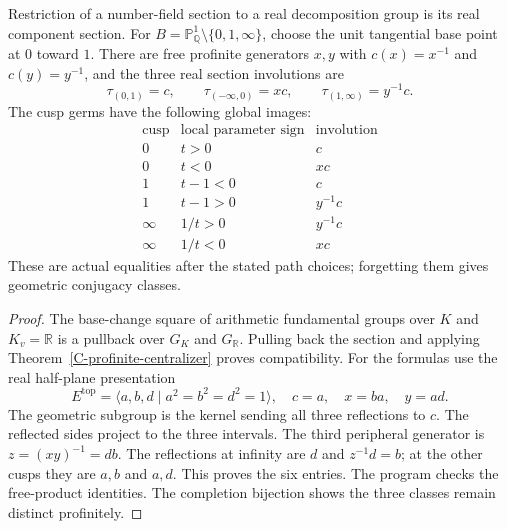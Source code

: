 \begin{proposition}
\label{C-tripod}
Restriction of a number-field section to a real
decomposition group is its real component section.
For $B=\mathbb P^1_{\mathbb Q}\setminus\{0,1,\infty\}$,
choose the unit tangential base point at $0$ toward $1$.
There are free profinite generators $x,y$ with
$c(x)=x^{-1}$ and $c(y)=y^{-1}$, and the three
real section involutions are
\[
 \tau_{(0,1)}=c,\qquad
 \tau_{(-\infty,0)}=xc,\qquad
 \tau_{(1,\infty)}=y^{-1}c .
\]
The cusp germs have the following global images:
\[
\begin{array}{c|c|c}
\text{cusp}&\text{local parameter sign}&\text{involution}\\ \hline
0&t>0&c\\
0&t<0&xc\\
1&t-1<0&c\\
1&t-1>0&y^{-1}c\\
\infty&1/t>0&y^{-1}c\\
\infty&1/t<0&xc
\end{array}
\]
These are actual equalities after the stated
path choices; forgetting them gives geometric
conjugacy classes.
\end{proposition}
\begin{proof}
The base-change square of arithmetic fundamental
groups over $K$ and $K_v=\mathbb R$ is a pullback
over $G_K$ and $G_{\mathbb R}$. Pulling back the
section and applying
Theorem~\ref{C-profinite-centralizer} proves compatibility.
For the formulas use the real half-plane presentation
\[
 E^{\mathrm{top}}
 =\langle a,b,d\mid a^2=b^2=d^2=1\rangle,\quad
 c=a,\quad x=ba,\quad y=ad .
\]
The geometric subgroup is the kernel sending all
three reflections to $c$. The reflected sides
project to the three intervals. The third
peripheral generator is $z=(xy)^{-1}=db$.
The reflections at infinity are $d$ and
$z^{-1}d=b$; at the other cusps they are
$a,b$ and $a,d$. This proves the six entries.
The program checks the free-product identities.
The completion bijection shows the three
classes remain distinct profinitely.
\end{proof}


